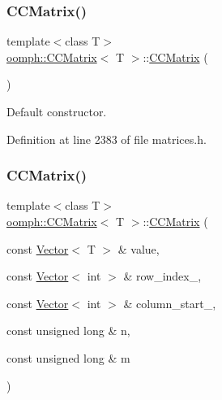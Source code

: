 \subsubsection{\texorpdfstring{C\+C\+Matrix()}{CCMatrix()}\hspace{0.1cm}{\footnotesize\ttfamily [1/3]}}
{\footnotesize\ttfamily template$<$class T$>$ \\
\hyperlink{classoomph_1_1CCMatrix}{oomph\+::\+C\+C\+Matrix}$<$ T $>$\+::\hyperlink{classoomph_1_1CCMatrix}{C\+C\+Matrix} (\begin{DoxyParamCaption}{ }\end{DoxyParamCaption})\hspace{0.3cm}{\ttfamily [inline]}}



Default constructor. 



Definition at line 2383 of file matrices.\+h.

\mbox{\label{classoomph_1_1CCMatrix_a4d8bf86e2cb87a710fb5485ac5904274}} 
\subsubsection{\texorpdfstring{C\+C\+Matrix()}{CCMatrix()}\hspace{0.1cm}{\footnotesize\ttfamily [2/3]}}
{\footnotesize\ttfamily template$<$class T$>$ \\
\hyperlink{classoomph_1_1CCMatrix}{oomph\+::\+C\+C\+Matrix}$<$ T $>$\+::\hyperlink{classoomph_1_1CCMatrix}{C\+C\+Matrix} (\begin{DoxyParamCaption}\item[{const \hyperlink{classoomph_1_1Vector}{Vector}$<$ T $>$ \&}]{value,  }\item[{const \hyperlink{classoomph_1_1Vector}{Vector}$<$ int $>$ \&}]{row\+\_\+index\+\_\+,  }\item[{const \hyperlink{classoomph_1_1Vector}{Vector}$<$ int $>$ \&}]{column\+\_\+start\+\_\+,  }\item[{const unsigned long \&}]{n,  }\item[{const unsigned long \&}]{m }\end{DoxyParamCaption})\hspace{0.3cm}{\ttfamily [inline]}}



